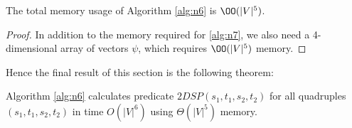 \begin{proposition}
The total memory usage of Algorithm \ref{alg:n6} is $\OO(|V|^5)$.
\end{proposition}
\begin{proof}
In addition to the memory required for \ref{alg:n7}, we also need a 4-dimensional array of vectors $\psi$, which requires $\OO(|V|^5)$ memory.
\end{proof}

Hence the final result of this section is the following theorem:
\begin{theorem}
Algorithm \ref{alg:n6} calculates predicate $2DSP(s_1, t_1, s_2, t_2)$ for all quadruples $(s_1, t_1, s_2, t_2)$ in time $O(|V|^6)$ using $\Theta(|V|^5)$ memory. 
\end{theorem}
